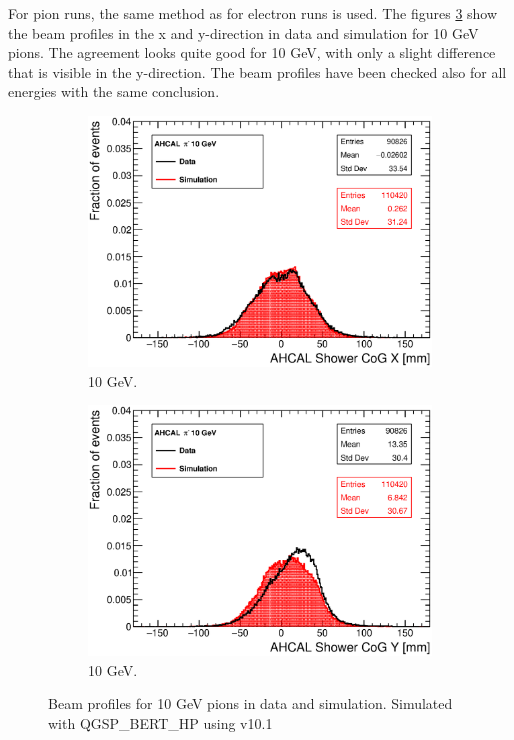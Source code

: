 For pion runs, the same method as for electron runs is used. The figures \ref{fig:BPpi} show the beam profiles in the x and y-direction in data and simulation for 10 GeV pions. The agreement looks quite good for 10 GeV, with only a slight difference that is visible in the y-direction. The beam profiles have been checked also for all energies with the same conclusion.

\begin{figure}[htbp!]
	\centering
	\begin{subfigure}[t]{0.49\textwidth}
		\includegraphics[width=1.\linewidth]{../Thesis_Plots/EnergyCalib/Plots/Run24306_CoGX_AHCAL_10GeV_Comparison.eps}
		\caption{10 GeV.} \label{fig:pi10GeVX}
	\end{subfigure}
	\hfill
	\begin{subfigure}[t]{0.49\textwidth}
		\includegraphics[width=1.\linewidth]{../Thesis_Plots/EnergyCalib/Plots/Run24306_CoGY_AHCAL_10GeV_Comparison.eps}
		\caption{10 GeV.} \label{fig:pi10GeVY}
	\end{subfigure}
	\caption{Beam profiles for 10 GeV pions in data and simulation. Simulated with QGSP\_BERT\_HP using \geant v10.1}
	\label{fig:BPpi}
\end{figure}

